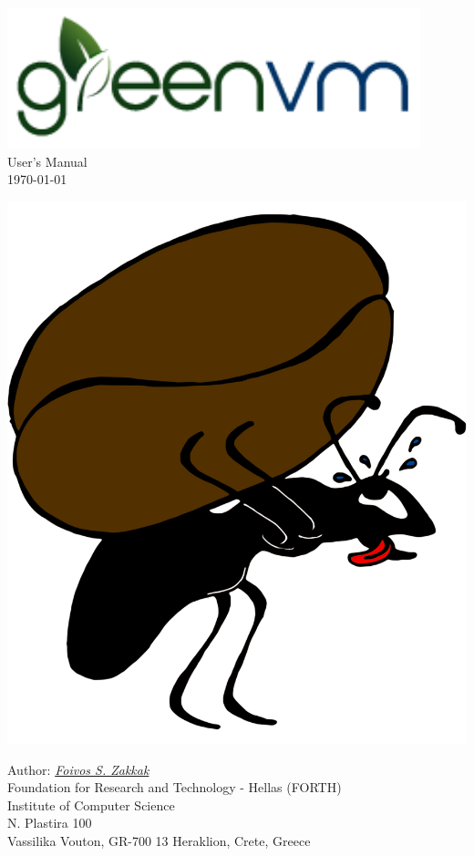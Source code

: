 \documentclass[
a4paper,
12pt,
]{report}
\begin{document}
\begin{titlepage}
\begin{center}

\href{http://www.ics.forth.gr/carv/greenvm}{\includegraphics[width=.5\linewidth]{greenvm}}\\
\LARGE User's Manual\\[0.5cm]
\large \today

\vfill

\includegraphics[width=.8\linewidth]{myrmigki_color}\\

\vfill

\large Author: \href{mailto:zakkak@ics.forth.gr}{\textit{Foivos S. Zakkak}}\\[1cm]

Foundation for Research and Technology - Hellas (FORTH)\\
Institute of Computer Science\\
N. Plastira 100\\
Vassilika Vouton, GR-700 13 Heraklion, Crete, Greece\\[0.5cm]

\end{center}

\end{titlepage}
\end{document}
